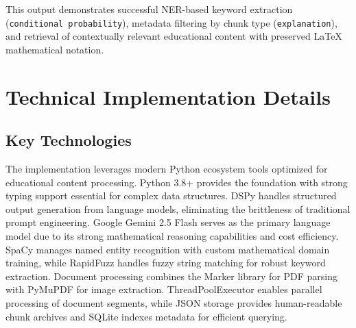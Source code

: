 \documentclass[12pt]{article}
\begin{document}
This output demonstrates successful NER-based keyword extraction (\texttt{conditional probability}), metadata filtering by chunk type (\texttt{explanation}), and retrieval of contextually relevant educational content with preserved LaTeX mathematical notation.



\section{Technical Implementation Details}

\subsection{Key Technologies}

The implementation leverages modern Python ecosystem tools optimized for educational content processing. Python 3.8+ provides the foundation with strong typing support essential for complex data structures. DSPy handles structured output generation from language models, eliminating the brittleness of traditional prompt engineering. Google Gemini 2.5 Flash serves as the primary language model due to its strong mathematical reasoning capabilities and cost efficiency. SpaCy manages named entity recognition with custom mathematical domain training, while RapidFuzz handles fuzzy string matching for robust keyword extraction. Document processing combines the Marker library for PDF parsing with PyMuPDF for image extraction. ThreadPoolExecutor enables parallel processing of document segments, while JSON storage provides human-readable chunk archives and SQLite indexes metadata for efficient querying.
\end{document}
